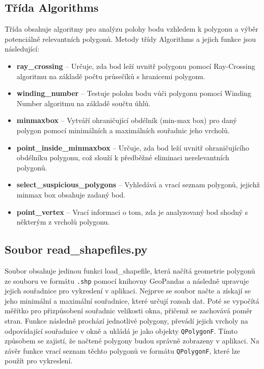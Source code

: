 \documentclass[a4paper,12pt]{article}
\begin{document}
\subsection{Třída Algorithms}
Třída obsahuje algoritmy pro analýzu polohy bodu vzhledem k polygonu a výběr potenciálně relevantních polygonů.
Metody třídy Algorithms a jejich funkce jsou následující:
\begin{itemize}
    \item \textbf{ray\_crossing} – Určuje, zda bod leží uvnitř polygonu pomocí Ray-Crossing algoritmu na základě počtu průsečíků s hranicemi polygonu.
    \item \textbf{winding\_number} – Testuje polohu bodu vůči polygonu pomocí Winding Number algoritmu na základě součtu úhlů.
    \item \textbf{minmaxbox} – Vytváří ohraničující obdélník (min-max box) pro daný polygon pomocí minimálních a maximálních souřadnic jeho vrcholů.
    \item \textbf{point\_inside\_minmaxbox} – Určuje, zda bod leží uvnitř ohraničujícího obdélníku polygonu, což slouží k předběžné eliminaci nerelevantních polygonů.
    \item \textbf{select\_suspicious\_polygons} – Vyhledává a vrací seznam polygonů, jejichž minmax box obsahuje zadaný bod.
    \item \textbf{point\_vertex} – Vrací informaci o tom, zda je analyzovaný bod shodný s některým z vrcholů polygonu.
\end{itemize}

\subsection{Soubor read\_shapefiles.py}
Soubor obsahuje jedinou funkci load\_shapefile, která načítá geometrie polygonů ze souboru ve formátu \texttt{.shp} pomocí knihovny GeoPandas a následně upravuje jejich souřadnice pro vykreslení v aplikaci. Nejprve se soubor načte a získají se jeho minimální a maximální souřadnice, které určují rozsah dat. Poté se vypočítá měřítko pro přizpůsobení souřadnic velikosti okna, přičemž se zachovává poměr stran. Funkce následně prochází jednotlivé polygony, převádí jejich vrcholy na odpovídající souřadnice v okně a ukládá je jako objekty \texttt{QPolygonF}. Tímto způsobem se zajistí, že načtené polygony budou správně zobrazeny v aplikaci. Na závěr funkce vrací seznam těchto polygonů ve formátu \texttt{QPolygonF}, které lze použít pro vykreslení.
\end{document}
